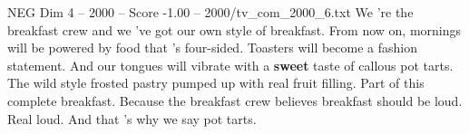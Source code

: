 \begin{textsample}{NEG Dim 4 – 2000 – Score -1.00 – 2000/tv\_com\_2000\_6.txt}  \label{ex:f4_neg_023}
We 're the breakfast crew and we 've got our own style of breakfast.
From now on, mornings will be powered by food that 's four-sided.
Toasters will become a fashion statement.
And our tongues will vibrate with a \textbf{sweet} taste of callous pot tarts.
The wild style frosted pastry pumped up with real fruit filling.
Part of this complete breakfast.
Because the breakfast crew believes breakfast should be loud.
Real loud.
And that 's why we say pot tarts.

\end{textsample}

